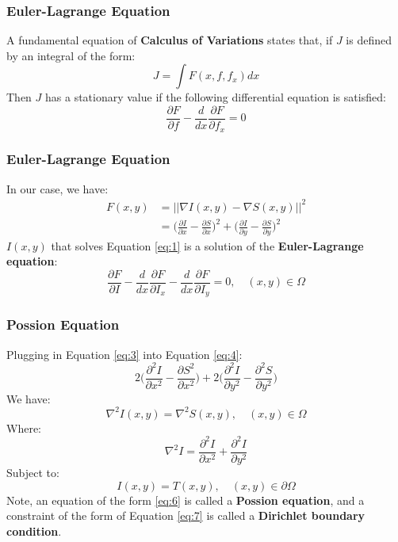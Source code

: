 \documentclass{beamer}
\begin{document}
\begin{frame}
    \frametitle{Euler-Lagrange Equation}
    A fundamental equation of {\bf Calculus of Variations} states that, if $J$ is defined by an integral of the form:
    \[
        J= \int F(x,f, f_x)dx
    \]
    Then $J$ has a stationary value if the following differential equation is satisfied:
    \[
        \frac{\partial F}{\partial f} - \frac{d}{dx}\frac{\partial F}{\partial f_x}=0
    \]
\end{frame}

\begin{frame}
    \frametitle{Euler-Lagrange Equation}
    In our case, we have:
    \begin{equation}
        \label{eq:3}
        \begin{split}
            F(x,y) &= ||\nabla I(x,y) - \nabla S(x,y) ||^{2}  \\ 
                   &= \bigg(\frac{\partial I}{\partial x} - \frac{\partial S}{\partial x}\bigg)^2 
                     + \bigg(\frac{\partial I}{\partial y} - \frac{\partial S}{\partial y}\bigg)^2 
        \end{split}        
    \end{equation}
    $I(x,y)$ that solves Equation \ref{eq:1} is a solution of the {\bf Euler-Lagrange equation}:
    \begin{equation}
        \label{eq:4}
        \frac{\partial F}{\partial I}
        -\frac{d}{dx}\frac{\partial F}{\partial I_x}
        -\frac{d}{dx}\frac{\partial F}{\partial I_y}=0, 
        \quad (x,y) \in \Omega 
    \end{equation}
\end{frame} 


\begin{frame}
    \frametitle{Possion Equation}
    Plugging in Equation \ref{eq:3} into Equation \ref{eq:4}:
    \begin{equation}
        \label{eq:5}
        2\bigg(\frac{\partial^2 I}{\partial x^2}-\frac{\partial S^2}{\partial x^2}\bigg) 
        + 2\bigg(\frac{\partial^2 I}{\partial y^2}-\frac{\partial^2 S}{\partial y^2}\bigg)     
    \end{equation} 
    We have:   
    \begin{equation}
        \label{eq:6}
        \nabla^2 I(x,y) = \nabla^2 S(x,y), \quad (x,y) \in \Omega 
    \end{equation}    
    Where:
    \[
        \nabla^2I=\frac{\partial^2 I}{\partial x^2}+\frac{\partial^2 I}{\partial y^2}
    \]
    Subject to:   
    \begin{equation}
        \label{eq:7}
         I(x,y) = T(x,y), \quad (x,y) \in \partial\Omega 
    \end{equation}        
    Note, an equation of the form \ref{eq:6} is called a {\bf Possion equation}, and a constraint of the form of  Equation \ref{eq:7} is called a {\bf Dirichlet boundary condition}.
\end{frame} 
\end{document}
